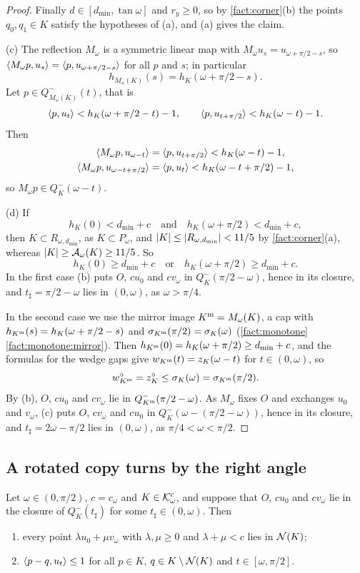 \begin{proof}
Finally $d\in[d_{\min},\tan\omega]$ and $r_y\ge0$, so by \cref{fact:corner}(b)
the points $q_0,q_1\in K$ satisfy the hypotheses of (a), and (a) gives the
claim.

(c) The reflection $M_\omega$ is a symmetric linear map with $M_\omega
u_s=u_{\omega+\pi/2-s}$, so $\langle M_\omega p,u_s\rangle=\langle p,u_{\omega+\pi/2-s}\rangle$ for
all $p$ and $s$; in particular
\[
  h_{M_\omega(K)}(s)=h_K(\omega+\pi/2-s).
\]
Let $p\in Q^-_{M_\omega(K)}(t)$, that is
\[
  \langle p,u_t\rangle<h_K(\omega+\pi/2-t)-1,\qquad\langle p,u_{t+\pi/2}\rangle<h_K(\omega-t)-1.
\]
Then
\begin{align*}
  \langle M_\omega p,u_{\omega-t}\rangle&=\langle p,u_{t+\pi/2}\rangle<h_K(\omega-t)-1,\\
  \langle M_\omega p,u_{\omega-t+\pi/2}\rangle&=\langle p,u_t\rangle<h_K(\omega-t+\pi/2)-1,
\end{align*}
so $M_\omega p\in Q^-_K(\omega-t)$.

(d) If
\[
  h_K(0)<d_{\min}+c\quad\text{and}\quad h_K(\omega+\pi/2)<d_{\min}+c,
\]
then $K\subset R_{\omega,d_{\min}}$, as $K\subset P_\omega$, and $\lvert K\rvert\le\lvert R_{\omega,d_{\min}}\rvert<11/5$ by \cref{fact:corner}(a), whereas $\lvert K\rvert\ge\mathcal{A}_\omega(K)\ge11/5$. So
\[
  h_K(0)\ge d_{\min}+c\quad\text{or}\quad h_K(\omega+\pi/2)\ge d_{\min}+c.
\]
In the first case (b) puts $O$, $cu_0$ and $cv_\omega$ in
$Q^-_K(\pi/2-\omega)$, hence in its closure, and $t_\sharp=\pi/2-\omega$ lies in
$(0,\omega)$, as $\omega>\pi/4$.

In the second case we use the mirror image $K^{\mathrm{m}}=M_\omega(K)$, a cap with
$h_{K^{\mathrm{m}}}(s)=h_K(\omega+\pi/2-s)$ and
$\sigma_{K^{\mathrm{m}}}(\pi/2)=\sigma_K(\omega)$
(\cref{fact:monotone}\ref{fact:monotone:mirror}). Then
$h_{K^{\mathrm{m}}}(0)=h_K(\omega+\pi/2)\ge d_{\min}+c$, and the formulas for the
wedge gaps give $w_{K^{\mathrm{m}}}(t)=z_K(\omega-t)$ for $t\in(0,\omega)$, so
\[
  w^\circ_{K^{\mathrm{m}}}=z^\circ_K\le\sigma_K(\omega)=\sigma_{K^{\mathrm{m}}}(\pi/2).
\]
By (b), $O$, $cu_0$ and $cv_\omega$ lie in $Q^-_{K^{\mathrm{m}}}(\pi/2-\omega)$. As
$M_\omega$ fixes $O$ and exchanges $u_0$ and $v_\omega$, (c) puts $O$,
$cv_\omega$ and $cu_0$ in $Q^-_K(\omega-(\pi/2-\omega))$, hence in its closure,
and $t_\sharp=2\omega-\pi/2$ lies in $(0,\omega)$, as $\pi/4<\omega<\pi/2$.
\end{proof}

\subsection{A rotated copy turns by the right angle}

\begin{lemma}\label{lem:width}
Let $\omega\in(0,\pi/2)$, $c=c_\omega$ and $K\in\mathcal{K}^{\mathrm{c}}_\omega$, and suppose that
$O$, $cu_0$ and $cv_\omega$ lie in the closure of $Q^-_K(t_\sharp)$ for some
$t_\sharp\in(0,\omega)$. Then
\begin{enumerate}[label=(\alph*)]
\item every point $\lambda u_0+\mu v_\omega$ with $\lambda,\mu\ge0$ and
$\lambda+\mu<c$ lies in $\mathcal{N}(K)$;
\item $\langle p-q,u_t\rangle\le1$ for all $p\in K$, $q\in K\setminus\mathcal{N}(K)$ and
$t\in[\omega,\pi/2]$.
\end{enumerate}
\end{lemma}

